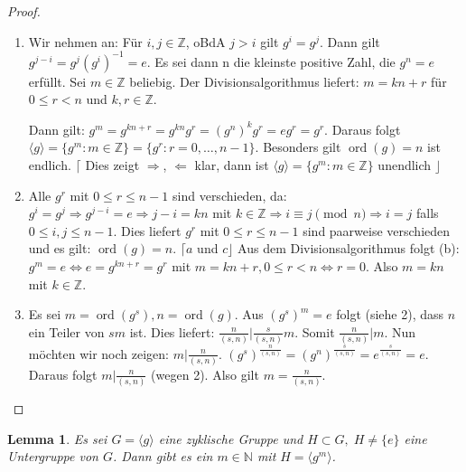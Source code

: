 \documentclass[12pt]{scrartcl} %
\DeclareMathOperator{\ord}{ord}
\newtheorem{lemma}{Lemma}
\theoremstyle{definition}
\theoremstyle{remark}
\begin{document}
\begin{proof} %
	\begin{enumerate}
		\item Wir nehmen an: Für $i,j \in \mathbb{Z}$, oBdA $j>i$ gilt $g^{i}=g^{j}$.
		Dann gilt $g^{j-i}=g^{j}(g^{i})^{-1}=e$.
		Es sei dann n die kleinste positive Zahl, die $g^{n}=e$ erfüllt.
		Sei $m \in \mathbb{Z}$ beliebig.
		Der Divisionsalgorithmus liefert: $m=kn+r$ für $0 \leq r < n$ und $k,r \in \mathbb{Z}$.

		Dann gilt:
		$g^{m}=g^{kn+r}=g^{kn}g^{r}=(g^{n})^{k}g^{r}=eg^{r}=g^{r}$.
		Daraus folgt $\langle g \rangle = \lbrace g^{m} : m \in \mathbb{Z}\rbrace = \lbrace g^{r} : r=0,\dots,n-1\rbrace$.
		Besonders gilt $\ord(g)=n$ ist endlich.
		$\lceil$ Dies zeigt $\Rightarrow$, $\Leftarrow$ klar, dann ist $\langle g \rangle = \lbrace g^{m} : m \in \mathbb{Z}\rbrace$ unendlich $\rfloor$
		\item Alle $g^{r}$ mit $0 \leq r \leq n-1$ sind verschieden, da:
		$g^{i}=g^{j} \Rightarrow g^{j-i}=e \Rightarrow j-i = kn$ mit $k\in\mathbb{Z} \Rightarrow i \equiv j \pmod{n} \Rightarrow i=j$ falls $0\leq i,j\leq n-1$.
		Dies liefert $g^{r}$ mit $0 \leq r \leq n-1$ sind paarweise verschieden und es gilt: $\ord(g)=n$. $\lceil a$ und $c\rfloor$
		Aus dem Divisionsalgorithmus folgt (b): $g^{m}=e \Leftrightarrow e=g^{kn+r}=g^{r}$ mit $m = kn+r, 0 \leq r < n \Leftrightarrow r=0$.
		Also $m=kn$ mit $k \in \mathbb{Z}$. %
		\item Es sei $m=\ord(g^{s}), n =\ord(g)$.
		Aus $(g^{s})^{m}=e$ folgt (siehe 2), dass $n$ ein Teiler von $sm$ ist.
		Dies liefert: $\frac{n}{(s,n)} \vert \frac{s}{(s,n)}m$. Somit $\frac{n}{(s,n)} \vert m$.
		Nun möchten wir noch zeigen: $m \vert \frac{n}{(s,n)}$. $(g^{s})^{\frac{n}{(s,n)}} = (g^{n})^{\frac{s}{(s,n)}}=e^{\frac{s}{(s,n)}}=e$.
		Daraus folgt $m \vert \frac{n}{(s,n)}$ (wegen 2).
		Also gilt $m = \frac{n}{(s,n)}$. \qedhere
	\end{enumerate}
\end{proof}

\begin{lemma}
	Es sei $G = \langle g \rangle$ eine zyklische Gruppe und $H \subset G,\; H\neq\{e\}$ eine Untergruppe von $G$. %
	Dann gibt es ein $m\in\mathbb{N}$ mit $H=\langle g^m\rangle$.
\end{lemma}
\end{document}
